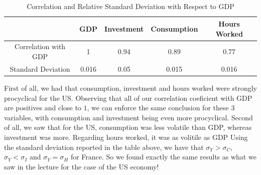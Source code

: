 \documentclass[12pt]{article}
\begin{document}
\subsection{}
\begin{table}[h]
  \centering
  \begin{tabular}{|c|c|c|c|c|}
      \hline
      & GDP & Investment & Consumption & Hours Worked \\
      \hline
      Correlation with GDP & 1 & 0.94 & 0.89 & 0.77 \\
      \hline
      Standard Deviation & 0.016 & 0.05 & 0.015 & 0.016 \\
      \hline
  \end{tabular}
  \caption{Correlation and Relative Standard Deviation with Respect to GDP}
\end{table}

First of all, we had that consumption, investment and hours worked were strongly procyclical for the US. 
Observing that all of our correlation coeficient with GDP are positives and close to $1$, we can enforce the same conclusion for these $3$ variables, with consumption and investment being even more procyclical.
\newline    
Second of all, we saw that for the US, consumption was less volatile than GDP, whereas investment was more. Regarding hours worked, it was as volitile as GDP
Using the standard deviation reported in the table above, we have that $\sigma_Y > \sigma_C$, $\sigma_Y < \sigma_I$ and $\sigma_Y = \sigma_H$ for France. So we found exactly the same results as what we saw in the lecture for the case of the US economy!
\end{document}
